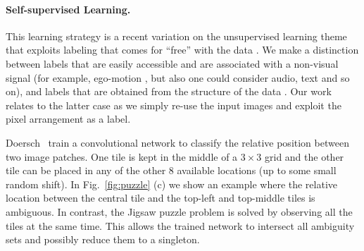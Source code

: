 \documentclass[runningheads]{llncs}
\begin{document}
\paragraph{\textbf{Self-supervised Learning.}} 

This learning strategy is a recent variation on the unsupervised learning theme that exploits labeling that comes for ``free'' with the data \cite{Carl2015,Gupta15,agrawalCM15}. We make a distinction between labels that are easily accessible and are associated with a non-visual signal (for example, ego-motion \cite{agrawalCM15}, but also one could consider audio, text and so on), and labels that are obtained from the structure of the data \cite{Carl2015,Gupta15}. Our work relates to the latter case as we simply re-use the input images and exploit the pixel arrangement as a label. 

Doersch~\etal \cite{Carl2015} train a convolutional network to classify the relative position between two image patches. One tile is kept in the middle of a $3\times 3$ grid and the other tile can be placed in any of the other $8$ available locations (up to some small random shift). In Fig.~\ref{fig:puzzle} (c) we show an example where the relative location between the central tile and the top-left and top-middle tiles is ambiguous. In contrast, the Jigsaw puzzle problem is solved by observing all the tiles at the same time. This allows the trained network to intersect all ambiguity sets and possibly reduce them to a singleton. 
\end{document}

